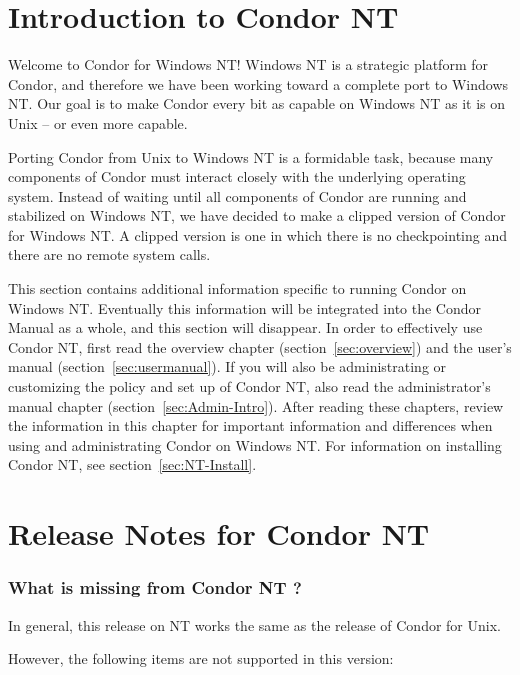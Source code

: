 \section{Introduction to Condor NT \VersionNotice}
Welcome to Condor for Windows NT!  
Windows NT is a strategic platform for Condor,
and therefore we have been working toward a complete
port to Windows NT.
Our goal is to make Condor every bit as capable on Windows NT as it is on
Unix -- or even more capable.  

Porting Condor from Unix to Windows NT is a formidable task,
because many
components of Condor must interact closely with the underlying operating
system.
Instead of waiting until all components of Condor are running
and stabilized on Windows NT,
we have decided to make a clipped version of Condor for Windows NT.
A clipped version is one in which there is no checkpointing
and there are no remote system calls.

This section contains additional information specific to running
Condor on Windows NT.  Eventually this information will be integrated
into the Condor Manual as a whole, and this section will disappear.
In order to effectively use Condor NT, first read the overview
chapter (section~\ref{sec:overview})
and the user's manual (section~\ref{sec:usermanual}).
If you will
also be administrating or customizing the policy and set up of Condor NT,
also read the administrator's manual 
chapter (section~\ref{sec:Admin-Intro}).
After reading these chapters,
review the information in this chapter for
important information and differences when using and administrating
Condor on Windows NT.
For information on installing Condor NT, see
section~\ref{sec:NT-Install}.


\section{Release Notes for Condor NT \VersionNotice}

\subsubsection{What is missing from Condor NT \VersionNotice?}

In general, this release on NT works the same as the 
release of Condor for Unix.  

However, the following items are not supported in this version:

